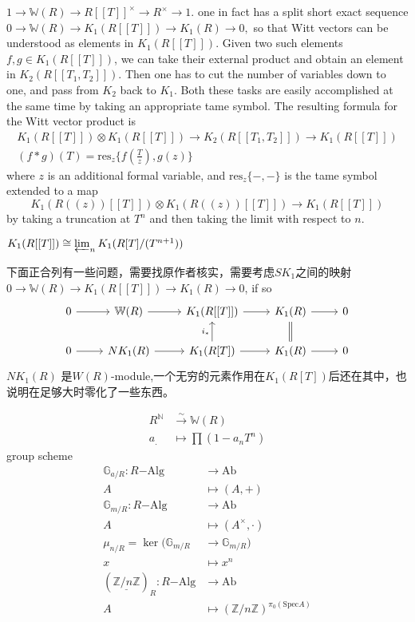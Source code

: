 $1\longrightarrow \mathbb{W}(R)\longrightarrow R[[T]]^{\times}\longrightarrow R^{\times} \longrightarrow 1.$
one in fact has a split short exact sequence
$0 \longrightarrow \mathbb{W}(R) \longrightarrow K_1(R[[T]]) \longrightarrow K_1(R) \longrightarrow 0,$
so that Witt vectors can be understood as elements in $K_1(R[[T]])$. Given two such
elements $f, g \in K_1(R[[T]])$, we can take their external product and obtain an element
in $K_2(R[[T_1, T_2 ]])$. Then one has to cut the number of variables down to one, and
pass from $K_2$ back to $K_1$. Both these tasks are easily accomplished at the same
time by taking an appropriate tame symbol. The resulting formula for the Witt
vector product is
\begin{gather*}
K_1(R[[T]])\otimes K_1(R[[T]]) \longrightarrow K_2(R[[T_1, T_2 ]])\longrightarrow  K_1(R[[T]])\\
(f*g)(T)=\mathrm{res}_z \{f(\frac{T}{z}),g(z)\}
\end{gather*}
where $z$ is an additional formal variable, and $\mathrm{res}_z \{-, -\}$ is the tame symbol extended to a map
\[K_1(R((z))[[T]]) \otimes K_1(R((z))[[T]]) \longrightarrow K_1(R[[T]])\]
by taking a truncation at $T^n$ and then taking the limit with respect to $n$.

$K_1(R[[T]]) \cong \varprojlim_n K_1(R[T]/(T^{n+1}))$

{\color{red}下面正合列有一些问题，需要找原作者核实，需要考虑$SK_1$之间的映射}
$0 \longrightarrow \mathbb{W}(R) \longrightarrow K_1(R[[T]]) \longrightarrow K_1(R) \longrightarrow 0$, if so
\[
\begin{tikzcd}
	0 \arrow[r]& \mathbb{W}(R) \arrow[r]& K_1(R[[T]]) \arrow[r]& K_1(R) \arrow[r] \arrow[equal,d]& 0\\
	0 \arrow[r]& NK_1(R) \arrow[r]& K_1(R[T]) \arrow[r] \arrow[u,"i_*"]& K_1(R) \arrow[r]& 0
\end{tikzcd}
\]
$NK_1(R)$ 是$W(R)$-module,一个无穷的元素作用在$K_1(R[T])$后还在其中，也说明在足够大时零化了一些东西。


\begin{align*}
R^{\mathbb{N}} & \overset{\sim}\longrightarrow \mathbb{W}(R)\\
a_. &\mapsto \prod (1-a_nT^n)
\end{align*}
group scheme 
\begin{align*}
\mathbb{G}_{a/R}\colon R\mathrm{-Alg} &\longrightarrow \mathrm{Ab}\\
A&\mapsto (A,+)\\
\mathbb{G}_{m/R}\colon R\mathrm{-Alg} &\longrightarrow \mathrm{Ab}\\
A&\mapsto (A^{\times},\cdot)\\
\mu_{n/R} = \ker (\mathbb{G}_{m/R} &\longrightarrow \mathbb{G}_{m/R})\\
x&\mapsto x^n\\
(\underline{\mathbb{Z}/n\mathbb{Z}})_{R}\colon R\mathrm{-Alg} &\longrightarrow \mathrm{Ab}\\
A&\mapsto (\mathbb{Z}/n\mathbb{Z})^{\pi_0(\mathrm{Spec} A)}\\
\end{align*}


